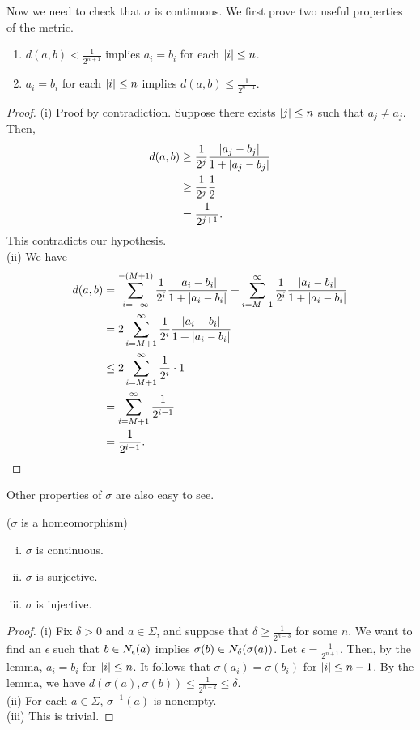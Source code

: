 \documentclass[12pt,twoside]{book}
\begin{document}
Now we need to check that $\sigma$ is continuous.
We first prove two useful properties of the metric.
\begin{proposition}
  \begin{enumerate}
    \item $d(a,b) < \frac{1}{2^{n+1}}$ implies $a_i = b_i$ for each $\left | i \right | \leq n$.
    \item $a_i = b_i$ for each $\left | i \right | \leq n$ implies $d(a,b) \leq \frac{1}{2^{n-1}}$.
  \end{enumerate}
  \begin{proof}
    (i) Proof by contradiction. Suppose there exists $\left | j \right | \leq n$ such that $a_j \neq a_j$.
    Then, 
    \begin{align*}
      d(a,b) &\geq \frac{1}{2^j} \frac{\left | a_j - b_j \right |}{1 + \left | a_j - b_j \right |}  \\
      &\geq \frac{1}{2^j} \frac{1}{2}  \\
      &= \frac{1}{2^{j+1}}.
    \end{align*}
    This contradicts our hypothesis.  \\
    (ii) We have
    \begin{align*}
      d(a,b) &= \sum\limits_{i = -\infty}^{-(M+1)} \frac{1}{2^i} \frac{\left | a_i - b_i \right |}{1 + \left | a_i - b_i \right |}  +  \sum\limits_{i = M+1}^{\infty} \frac{1}{2^i} \frac{\left | a_i - b_i \right |}{1 + \left | a_i - b_i \right |}  \\
      &= 2 \sum\limits_{i = M+1}^{\infty} \frac{1}{2^i} \frac{\left | a_i - b_i \right |}{1 + \left | a_i - b_i \right |}  \\
      &\leq 2 \sum\limits_{i = M+1}^{\infty} \frac{1}{2^i} \cdot 1  \\
      &= \sum\limits_{i = M+1}^{\infty} \frac{1}{2^{i-1}}   \\
      &= \frac{1}{2^{i-1}}.
    \end{align*}
  \end{proof}
\end{proposition}
Other properties of $\sigma$ are also easy to see.
\begin{proposition}
  ($\sigma$ is a homeomorphism)
  \begin{enumerate}[(i)]
    \item $\sigma$ is continuous.
    \item  $\sigma$ is surjective.
    \item  $\sigma$ is injective.
  \end{enumerate}
  \begin{proof}
    (i)
    Fix $\delta > 0$ and $a \in \Sigma$, and suppose that $\delta \geq \frac{1}{2^{n-3}}$ for some $n$.
    We want to find an $\epsilon$ such that $b \in N_{\epsilon}(a)$ implies $\sigma(b) \in N_{\delta}(\sigma(a))$.
    Let $\epsilon = \frac{1}{2^{n+1}}$.
    Then, by the lemma, $a_i = b_i$ for $\left | i \right | \leq n$.
    It follows that $\sigma(a_i) = \sigma(b_i)$ for $\left | i \right | \leq n-1$.
    By the lemma, we have $d(\sigma(a), \sigma(b)) \leq \frac{1}{2^{n-2}} \leq \delta$.  \\
    (ii) For each $a \in \Sigma$, $\sigma^{-1}(a)$ is nonempty.  \\
    (iii) This is trivial.
  \end{proof}
  \label{prop:symb-sigma-cont}
\end{proposition}
\end{document}
